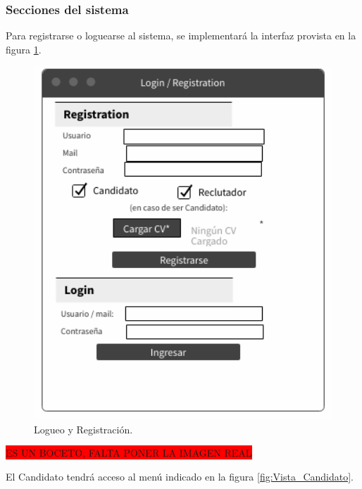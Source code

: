 \documentclass[12pt,a4paper]{article}
\begin{document}
\subsubsection{Secciones del sistema}

Para registrarse o loguearse al sistema, se implementará la interfaz provista en la figura \ref{fig:Vista_Registro}.

\begin{figure}[H]    %
  \centering
  \includegraphics[width=1\textwidth]{images/Vista_Registro.png}
  \caption{Logueo y Registración.}  
  \label{fig:Vista_Registro}
\end{figure}

\colorbox{red}{ES UN BOCETO, FALTA PONER LA IMAGEN REAL}

El Candidato tendrá acceso al menú indicado en la figura \ref{fig:Vista_Candidato}. 
\end{document}

